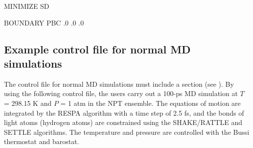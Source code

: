 \documentclass[a4paper,11pt,oneside,english]{sphinxmanual}
\begin{document}
\begin{sphinxVerbatim}[commandchars=\\\{\}]
\PYG{o}{[}MINIMIZE\PYG{o}{]}
             SD           
                      
                
                
               
                

\PYG{o}{[}BOUNDARY\PYG{o}{]}
               PBC          
         .0         
         .0         
         .0         
\end{sphinxVerbatim}

\clearpage


\subsection{Example control file for normal MD simulations}
\label{\detokenize{01_Getting_Started:example-control-file-for-normal-md-simulations}}
The control file for normal MD simulations must include a \sphinxstylestrong{{[}DYNAMICS{]}} section (see {\hyperref[\detokenize{06_Dynamics:dynamics}]{}}).
By using the following control file, the users carry out a
100-ps MD simulation at \(T\) = 298.15 K and \(P\) = 1 atm in the NPT ensemble.
The equations of motion are integrated by the RESPA algorithm
with a time step of 2.5 fs, and the bonds of light atoms (hydrogen atoms)
are constrained using the SHAKE/RATTLE and SETTLE algorithms.
The temperature and pressure are controlled with the Bussi thermostat and barostat.
\end{document}

